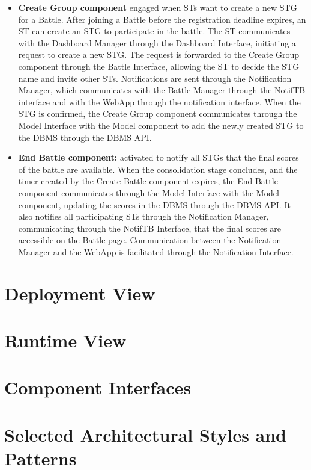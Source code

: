 \begin{itemize}
    \item \textbf{Create Group component} engaged when STs want to create a new STG for a Battle. After joining a Battle before the registration deadline expires, an ST can create an STG to participate in the battle. The ST communicates with the Dashboard Manager through the Dashboard Interface, initiating a request to create a new STG. The request is forwarded to the Create Group component through the Battle Interface, allowing the ST to decide the STG name and invite other STs. Notifications are sent through the Notification Manager, which communicates with the Battle Manager through the NotifTB interface and with the WebApp through the notification interface. When the STG is confirmed, the Create Group component communicates through the Model Interface with the Model component to add the newly created STG to the DBMS through the DBMS API.
    \item \textbf{End Battle component:} activated to notify all STGs that the final scores of the battle are available. When the consolidation stage concludes, and the timer created by the Create Battle component expires, the End Battle component communicates through the Model Interface with the Model component, updating the scores in the DBMS through the DBMS API. It also notifies all participating STs through the Notification Manager, communicating through the NotifTB Interface, that the final scores are accessible on the Battle page. Communication between the Notification Manager and the WebApp is facilitated through the Notification Interface.
\end{itemize}


\section{Deployment View}
\label{sec:deployment_view}%

\section{Runtime View}
\label{sec:runtime_view}%

\section{Component Interfaces}
\label{sec:component_interfaces}%

\section{Selected Architectural Styles and Patterns}
\label{sec:selected_Srchitectural_styles_patterns}%

